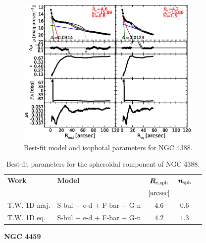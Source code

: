 \documentclass[preprint2]{emulateapj}
\newcommand{\fitfigurewidth}{0.8\textwidth}
\begin{document}
  \begin{figure}[h]
  \begin{center}
  \includegraphics[width=\fitfigurewidth]{images/n4388_1Dfit.eps}
  \caption{Best-fit model and isophotal parameters for NGC 4388.}
  \end{center}
  \end{figure}

  \begin{table}[h]
  \small
  \caption{Best-fit parameters for the spheroidal component of NGC 4388.}
  \begin{center}
  \begin{tabular}{llccc}
  \hline
  {\bf Work} & {\bf Model}   & $\bm R_{\rm e,sph}$    & $\bm n_{\rm sph}$ \\
    &  &  $[\rm arcsec]$ & \\
  \hline
  T.W. 1D maj. & S-bul + e-d + F-bar + G-n & $4.6$  &  $0.6$ \\
  T.W. 1D eq.  & S-bul + e-d + F-bar + G-n & $4.2$  &  $1.3$ \\
  \hline
  \end{tabular}
  \end{center}
  \label{tab:n4388}
  \end{table}


  \clearpage\newpage\noindent
  {\bf NGC 4459 \\}
\end{document}

